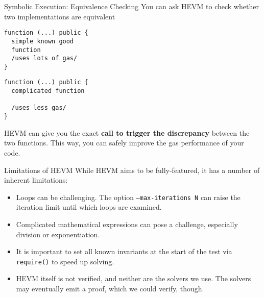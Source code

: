 \documentclass{beamer}
\begin{document}
\begin{frame}[fragile=singleslide]{Symbolic Execution: Equivalence Checking}
You can ask HEVM to check whether two implementations are equivalent
\bigskip
\\

\begin{minipage}[b]{0.45\textwidth}
\begin{Verbatim}[frame=single, framerule=0.2mm, framesep=2mm,fontsize=\small]
function (...) public {
  simple known good
  function
  /uses lots of gas/
}
    \end{Verbatim}
  \end{minipage}
  \begin{minipage}[b]{0.45\textwidth}
  \begin{Verbatim}[frame=single, framerule=0.2mm, framesep=2mm,fontsize=\small]
function (...) public {
  complicated function
  
  /uses less gas/
}
\end{Verbatim}
\end{minipage}

HEVM can give you the exact \textbf{call to trigger the discrepancy} between the two functions. This way, you can safely improve the gas performance of your code.
\end{frame}




\begin{frame}[fragile=singleslide]{Limitations of HEVM}
While HEVM aims to be fully-featured, it has a number of inherent limitations:

\begin{itemize}
\item Loops can be challenging. The option \texttt{--max-iterations N} can raise the iteration limit until which loops are examined.
\item Complicated mathematical expressions can pose a challenge, especially division or exponentiation.
\item It is important to set all known invariants at the start of the test via \texttt{require()} to speed up solving.
\item HEVM itself is not verified, and neither are the solvers we use. The solvers may eventually emit a proof, which we could verify, though.
\end{itemize}
\end{frame}
\end{document}
